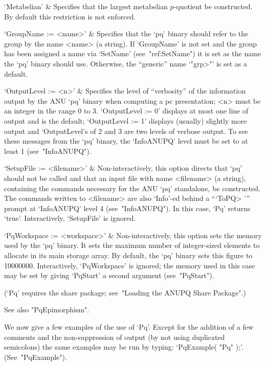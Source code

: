 `Metabelian' &
Specifies that the largest metabelian  $p$-quotient  be  constructed.  By
default this restriction is not enforced.

`GroupName := <name>' &
Specifies that the `pq' binary should refer to  the  group  by  the  name
<name> (a string). If `GroupName' is not  set  and  the  group  has  been
assigned a name via `SetName' (see~"ref:SetName") it is set as  the  name
the `pq' binary should use. Otherwise, the ``generic'' name `"\<grp>"' is
set as a default.

`OutputLevel := <n>' &
Specifies the level of ``verbosity'' of the information output by the ANU
`pq' binary when computing a pc presentation; <n> must be an  integer  in
the range 0 to 3. `OutputLevel := 0' displays at most one line of  output
and is the default; `OutputLevel := 1' displays (usually)  slightly  more
output and `OutputLevel's of 2 and 3 are two levels of verbose output. To
see these messages from the `pq' binary, the `InfoANUPQ'  level  must  be
set to at least 1 (see~"InfoANUPQ").

`SetupFile := <filename>' &
Non-interactively, this option directs that `pq' should not be called and
that an input file  with  name  <filename>  (a  string),  containing  the
commands necessary for the  ANU  `pq'  standalone,  be  constructed.  The
commands written to <filename> are also `Info'-ed behind  a  ```ToPQ> '''
prompt at `InfoANUPQ' level  4  (see~"InfoANUPQ").  In  this  case,  `Pq'
returns `true'. Interactively, `SetupFile' is ignored.

`PqWorkspace := <workspace>' &
Non-interactively, this option sets the memory used by the  `pq'  binary.
It sets the maximum number of integer-sized elements to allocate  in  its
main storage array. By default, the  `pq'  binary  sets  this  figure  to
10000000. Interactively, `PqWorkspace' is ignored;  the  memory  used  in
this  case  may  be  set  by   giving   `PqStart'   a   second   argument
(see~"PqStart").

\enditems

(`Pq' requires the {\ANUPQ} share package; see~"Loading the  ANUPQ  Share
Package".)

See also "PqEpimorphism".

We now give a few examples of the use of `Pq'. Except for the addition of
a few comments and the non-suppression of output (by not using duplicated
semicolons) the same examples may be run by typing: `PqExample( "Pq" );'.
(See~"PqExample").

